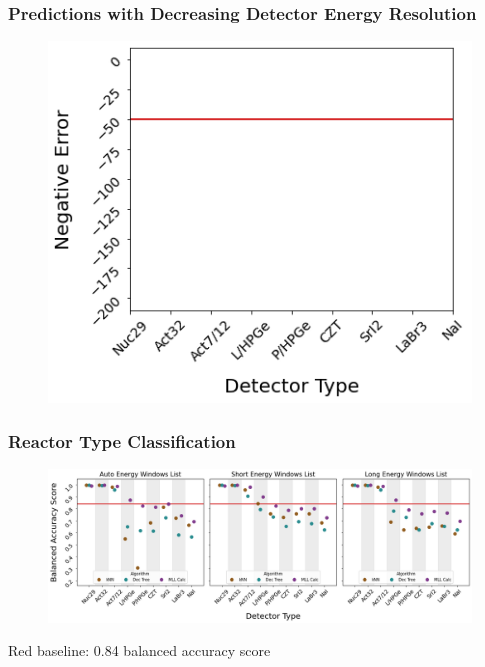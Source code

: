 \begin{frame}
  \frametitle{Predictions with Decreasing Detector Energy Resolution}
  \begin{figure}
    \centering
    \includegraphics[height=0.7\textheight]{./figures/plot_description.png}
  \end{figure}
\end{frame}

\begin{frame}
  \frametitle{Reactor Type Classification}
  \begin{adjustwidth}{-15pt}{-10pt}
  \begin{figure}
    \centering
    \includegraphics[width=1.1\textwidth]{./figures/detector_preds_wrt_enlist_BalAcc_rxtr.png}
  \end{figure}
  \vspace{12pt} \centering Red baseline: 0.84 balanced accuracy score
  \end{adjustwidth}
\end{frame}

